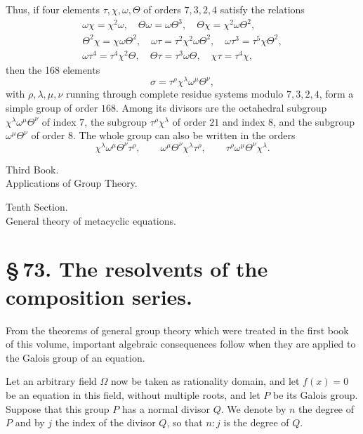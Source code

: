 \documentclass[11pt]{article}
\begin{document}
Thus, if four elements $\tau,\chi,\omega,\Theta$ of orders $7,3,2,4$ satisfy the relations
\begin{equation}
\begin{gathered}
 \omega\chi=\chi^2\omega,
 \quad \Theta\omega=\omega\Theta^3,
 \quad \Theta\chi=\chi^2\omega\Theta^2,\\
 \Theta^2\chi=\chi\omega\Theta^2,
 \quad \omega\tau=\tau^2\chi^2\omega\Theta^2,
 \quad \omega\tau^3=\tau^5\chi\Theta^2,\\
 \omega\tau^4=\tau^4\chi^2\Theta,
 \quad \Theta\tau=\tau^3\omega\Theta,
 \quad \chi\tau=\tau^4\chi,
\end{gathered}
\tag{15}
\end{equation}
then the 168 elements
\begin{equation}
 \sigma=\tau^\rho\chi^\lambda\omega^\mu\Theta^\nu,
 \tag{16}
\end{equation}
with $\rho,\lambda,\mu,\nu$ running through complete residue systems modulo $7,3,2,4$, form a simple group of order $168$. Among its divisors are the octahedral subgroup $\chi^\lambda\omega^\mu\Theta^\nu$ of index $7$, the subgroup $\tau^\rho\chi^\lambda$ of order $21$ and index $8$, and the subgroup $\omega^\mu\Theta^\nu$ of order $8$. The whole group can also be written in the orders
\[
 \chi^\lambda\omega^\mu\Theta^\nu\tau^\rho,
 \qquad
 \omega^\mu\Theta^\nu\chi^\lambda\tau^\rho,
 \qquad
 \tau^\rho\omega^\mu\Theta^\nu\chi^\lambda.
\]


\clearpage
\begin{center}
{\Large Third Book.}\\[0.5em]
{\large Applications of Group Theory.}
\end{center}

\begin{center}
{\large Tenth Section.}\\[0.4em]
{\large General theory of metacyclic equations.}
\end{center}

\section*{\S\,73. The resolvents of the composition series.}

From the theorems of general group theory which were treated in the first book of this volume, important algebraic consequences follow when they are applied to the Galois group of an equation.

Let an arbitrary field $\Omega$ now be taken as rationality domain, and let $f(x)=0$ be an equation in this field, without multiple roots, and let $P$ be its Galois group. Suppose that this group $P$ has a normal divisor $Q$. We denote by $n$ the degree of $P$ and by $j$ the index of the divisor $Q$, so that $n:j$ is the degree of $Q$.
\end{document}

